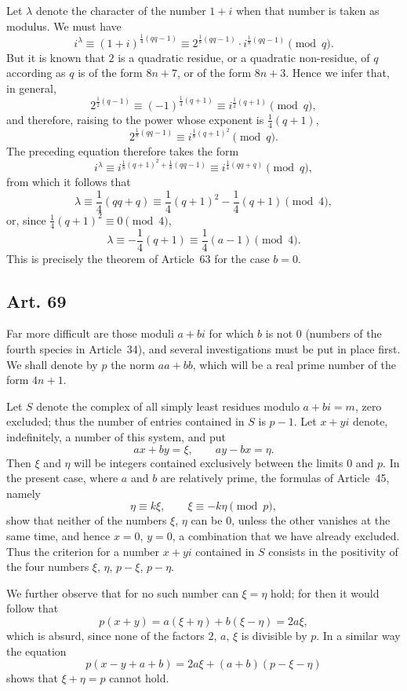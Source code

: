 \documentclass[12pt]{article}
\newcommand{\art}[1]{\subsection*{Art. #1}}
\begin{document}
Let $\lambda$ denote the character of the number $1+i$ when that number is taken as modulus. We must have
\[
i^\lambda \equiv (1+i)^{\frac14(qq-1)}
       \equiv 2^{\frac18(qq-1)}\cdot i^{\frac18(qq-1)}
       \pmod q.
\]
But it is known that $2$ is a quadratic residue, or a quadratic non-residue, of $q$ according as $q$ is of the form $8n+7$, or of the form $8n+3$. Hence we infer that, in general,
\[
2^{\frac12(q-1)}\equiv (-1)^{\frac14(q+1)}
      \equiv i^{\frac12(q+1)}\pmod q,
\]
and therefore, raising to the power whose exponent is $\frac14(q+1)$,
\[
2^{\frac18(qq-1)}\equiv i^{\frac18(q+1)^2}\pmod q.
\]
The preceding equation therefore takes the form
\[
i^\lambda\equiv i^{\frac18(q+1)^2+\frac18(qq-1)}
      \equiv i^{\frac14(qq+q)}\pmod q,
\]
from which it follows that
\[
\lambda\equiv \frac14(qq+q)
      \equiv \frac14(q+1)^2-\frac14(q+1)\pmod4,
\]
or, since $\frac14(q+1)^2\equiv0\pmod4$,
\[
\lambda\equiv-\frac14(q+1)\equiv\frac14(a-1)\pmod4.
\]
This is precisely the theorem of Article~63 for the case $b=0$.

\art{69}
Far more difficult are those moduli $a+bi$ for which $b$ is not $0$ (numbers of the fourth species in Article~34), and several investigations must be put in place first. We shall denote by $p$ the norm $aa+bb$, which will be a real prime number of the form $4n+1$.

Let $S$ denote the complex of all simply least residues modulo $a+bi=m$, zero excluded; thus the number of entries contained in $S$ is $p-1$. Let $x+yi$ denote, indefinitely, a number of this system, and put
\[
ax+by=\xi,\qquad ay-bx=\eta.
\]
Then $\xi$ and $\eta$ will be integers contained exclusively between the limits $0$ and $p$. In the present case, where $a$ and $b$ are relatively prime, the formulas of Article~45, namely
\[
\eta\equiv k\xi,\qquad \xi\equiv-k\eta\pmod p,
\]
show that neither of the numbers $\xi$, $\eta$ can be $0$, unless the other vanishes at the same time, and hence $x=0$, $y=0$, a combination that we have already excluded. Thus the criterion for a number $x+yi$ contained in $S$ consists in the positivity of the four numbers $\xi$, $\eta$, $p-\xi$, $p-\eta$.

We further observe that for no such number can $\xi=\eta$ hold; for then it would follow that
\[
p(x+y)=a(\xi+\eta)+b(\xi-\eta)=2a\xi,
\]
which is absurd, since none of the factors $2$, $a$, $\xi$ is divisible by $p$. In a similar way the equation
\[
p(x-y+a+b)=2a\xi+(a+b)(p-\xi-\eta)
\]
shows that $\xi+\eta=p$ cannot hold.
\end{document}
